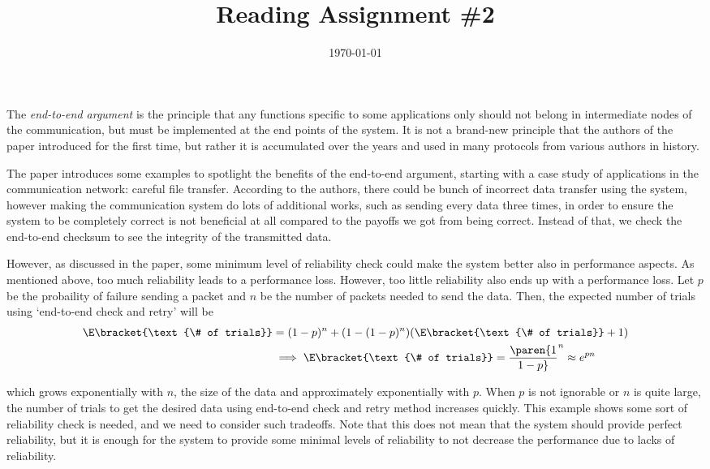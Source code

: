 \documentclass{homework}
\title{Reading Assignment \#2}
\date{\today}
\begin{document}
\maketitle


The \emph{end-to-end argument} is the principle that any functions specific to some applications only should not belong in intermediate nodes of the communication, but must be implemented at the end points of the system. It is not a brand-new principle that the authors of the paper introduced for the first time, but rather it is accumulated over the years and used in many protocols from various authors in history.

The paper introduces some examples to spotlight the benefits of the end-to-end argument, starting with a case study of applications in the communication network: careful file transfer. According to the authors, there could be bunch of incorrect data transfer using the system, however making the communication system do lots of additional works, such as sending every data three times, in order to ensure the system to be completely correct is not beneficial at all compared to the payoffs we got from being correct. Instead of that, we check the end-to-end checksum to see the integrity of the transmitted data.

However, as discussed in the paper, some minimum level of reliability check could make the system better also in performance aspects. As mentioned above, too much reliability leads to a performance loss. However, too little reliability also ends up with a performance loss. Let $p$ be the probaility of failure sending a packet and $n$ be the number of packets needed to send the data. Then, the expected number of trials using `end-to-end check and retry' will be
\vspace*{-1em}
\begin{align*}
  \E\bracket{\text{\# of trials}} &= (1-p)^n + (1-(1-p)^n)(\E\bracket{\text{\# of trials}} + 1)\\ &\implies \E\bracket{\text{\# of trials}} = \paren{1 \over 1-p}^n\approx e^{pn} 
\end{align*}
\vspace*{-2em}

\noindent which grows exponentially with $n$, the size of the data and approximately exponentially with $p$. When $p$ is not ignorable or $n$ is quite large, the number of trials to get the desired data using end-to-end check and retry method increases quickly. This example shows some sort of reliability check is needed, and we need to consider such tradeoffs. Note that this does not mean that the system should provide perfect reliability, but it is enough for the system to provide some minimal levels of reliability to not decrease the performance due to lacks of reliability.
\end{document}
